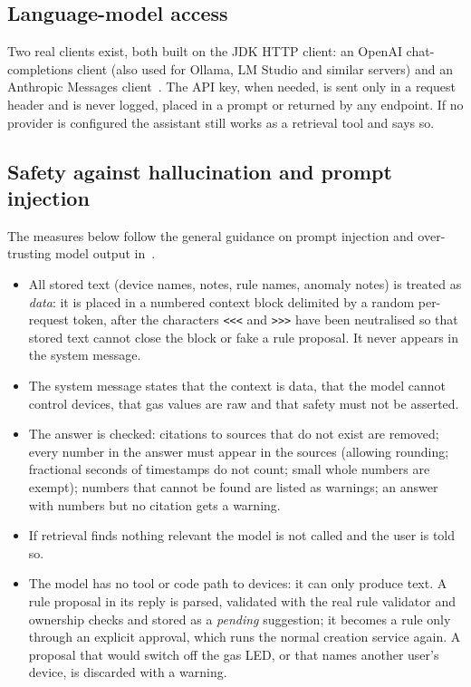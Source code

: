 \documentclass[12pt,a4paper,oneside]{report}
\begin{document}
\subsection{Language-model access}
Two real clients exist, both built on the JDK HTTP client: an OpenAI chat-completions client (also used for Ollama, LM Studio and similar servers) and an Anthropic Messages client~\cite{anthropicdocs}. The API key, when needed, is sent only in a request header and is never logged, placed in a prompt or returned by any endpoint. If no provider is configured the assistant still works as a retrieval tool and says so.

\subsection{Safety against hallucination and prompt injection}
The measures below follow the general guidance on prompt injection and over-trusting model output in~\cite{owasp}.
\begin{itemize}
  \item All stored text (device names, notes, rule names, anomaly notes) is treated as \emph{data}: it is placed in a numbered context block delimited by a random per-request token, after the characters \texttt{<<<} and \texttt{>>>} have been neutralised so that stored text cannot close the block or fake a rule proposal. It never appears in the system message.
  \item The system message states that the context is data, that the model cannot control devices, that gas values are raw and that safety must not be asserted.
  \item The answer is checked: citations to sources that do not exist are removed; every number in the answer must appear in the sources (allowing rounding; fractional seconds of timestamps do not count; small whole numbers are exempt); numbers that cannot be found are listed as warnings; an answer with numbers but no citation gets a warning.
  \item If retrieval finds nothing relevant the model is not called and the user is told so.
  \item The model has no tool or code path to devices: it can only produce text. A rule proposal in its reply is parsed, validated with the real rule validator and ownership checks and stored as a \emph{pending} suggestion; it becomes a rule only through an explicit approval, which runs the normal creation service again. A proposal that would switch off the gas LED, or that names another user's device, is discarded with a warning.
\end{itemize}
\end{document}
